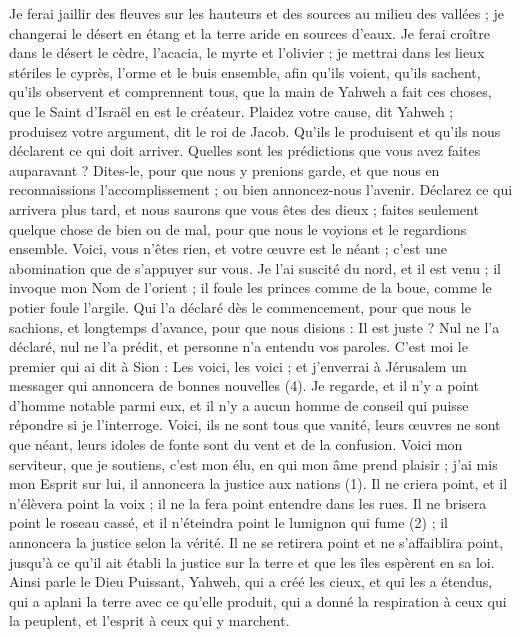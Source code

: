\begin{multicols}{2}
Je ferai jaillir des fleuves sur les hauteurs et des sources au milieu des vallées ; je changerai le désert en étang et la terre aride en sources d'eaux.
Je ferai croître dans le désert le cèdre, l’acacia, le myrte et l'olivier ; je mettrai dans les lieux stériles le cyprès, l'orme et le buis ensemble,
afin qu’ils voient, qu’ils sachent, qu’ils observent et comprennent tous, que la main de Yahweh a fait ces choses, que le Saint d'Israël en est le créateur.
Plaidez votre cause, dit Yahweh ; produisez votre argument, dit le roi de Jacob.
Qu’ils le produisent et qu’ils nous déclarent ce qui doit arriver. Quelles sont les prédictions que vous avez faites auparavant ? Dites-le, pour que nous y prenions garde, et que nous en reconnaissions l’accomplissement ; ou bien annoncez-nous l’avenir.
Déclarez ce qui arrivera plus tard, et nous saurons que vous êtes des dieux ; faites seulement quelque chose de bien ou de mal, pour que nous le voyions et le regardions ensemble.
Voici, vous n’êtes rien, et votre œuvre est le néant ; c’est une abomination que de s’appuyer sur vous.
Je l'ai suscité du nord, et il est venu ; il invoque mon Nom de l’orient ; il foule les princes comme de la boue, comme le potier foule l’argile.
Qui l’a déclaré dès le commencement, pour que nous le sachions, et longtemps d’avance, pour que nous disions : Il est juste ? Nul ne l’a déclaré, nul ne l’a prédit, et personne n’a entendu vos paroles.
C’est moi le premier qui ai dit à Sion : Les voici, les voici ; et j’enverrai à Jérusalem un messager qui annoncera de bonnes nouvelles (4).
Je regarde, et il n'y a point d'homme notable parmi eux, et il n'y a aucun homme de conseil qui puisse répondre si je l’interroge.
Voici, ils ne sont tous que vanité, leurs œuvres ne sont que néant, leurs idoles de fonte sont du vent et de la confusion.
\VerseOne{}Voici mon serviteur, que je soutiens, c'est mon élu, en qui mon âme prend plaisir ; j'ai mis mon Esprit sur lui, il annoncera la justice aux nations (1).
Il ne criera point, et il n’élèvera point la voix ; il ne la fera point entendre dans les rues.
Il ne brisera point le roseau cassé, et il n'éteindra point le lumignon qui fume (2) ; il annoncera la justice selon la vérité.
Il ne se retirera point et ne s’affaiblira point, jusqu’à ce qu’il ait établi la justice sur la terre et que les îles espèrent en sa loi.
Ainsi parle le Dieu Puissant, Yahweh, qui a créé les cieux, et qui les a étendus, qui a aplani la terre avec ce qu'elle produit, qui a donné la respiration à ceux qui la peuplent, et l'esprit à ceux qui y marchent.

\end{multicols}
